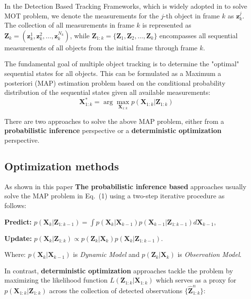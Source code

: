 \documentclass[12pt, a4paper]{article}
\begin{document}
In the Detection Based Tracking Frameworks, which is widely adopted in to solve MOT problem, 
we denote the measurements for the $j$-th object in frame $k$ as $\mathbf{z}_k^j$. The collection of all measurements 
in frame $k$ is represented as $\mathbf{Z}_k = (\mathbf{z}_k^1, \mathbf{z}_k^2, \ldots, \mathbf{z}_k^{N_k})$, while 
$\mathbf{Z}_{1:k} = \{\mathbf{Z}_1, \mathbf{Z}_2, \ldots, \mathbf{Z}_k\}$ encompasses all sequential measurements 
of all objects from the initial frame through frame $k$.

The fundamental goal of multiple object tracking is to determine the "optimal" sequential states for all objects. This can be 
formulated as a Maximum a posteriori (MAP) estimation problem based on the conditional probability distribution of the sequential 
states given all available measurements:
\begin{equation}
\mathbf{X}_{1:k}^* = \arg\max_{\mathbf{X}_{1:k}} p(\mathbf{X}_{1:k} | \mathbf{Z}_{1:k})
\end{equation}

There are two approaches to solve the above MAP problem, either from a \textbf{probabilistic inference} perspective or a
\textbf{deterministic optimization} perspective.

\subsection{Optimization methods}

As shown in this paper \cite{Inference_base} \textbf{The probabilistic inference based} approaches usually solve 
the MAP problem in Eq.~(1) using a two-step iterative procedure as follows:

\textbf{Predict:} $p(\mathbf{X}_k|\mathbf{Z}_{1:k-1}) = \int p(\mathbf{X}_k|\mathbf{X}_{k-1})p(\mathbf{X}_{k-1}|\mathbf{Z}_{1:k-1})d\mathbf{X}_{k-1}$,

\textbf{Update:} $p(\mathbf{X}_k|\mathbf{Z}_{1:k}) \propto p(\mathbf{Z}_k|\mathbf{X}_k)p(\mathbf{X}_k|\mathbf{Z}_{1:k-1})$.

Where: $p(\mathbf{X}_k|\mathbf{X}_{k-1})$ is \textit{Dynamic Model} and $p(\mathbf{Z}_k|\mathbf{X}_k)$ is  \textit{Observation Model}.

In contrast, \textbf{deterministic optimization} approaches tackle the problem by maximizing the likelihood 
function $L(\mathbf{Z}_{1:k}|\mathbf{X}_{1:k})$ which serves as a proxy for $p(\mathbf{X}_{1:k}|\mathbf{Z}_{1:k})$ across the collection of detected observations 
$\{\hat{\mathbf{Z}}^n_{1:k}\}$:
\end{document}
